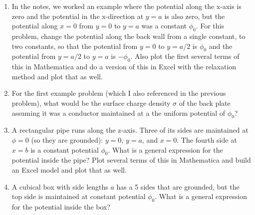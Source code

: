 \documentclass[letterpaper,12pt]{article}
\begin{document}
\begin{enumerate}
\setlength\itemsep{3 in}

\item
In the notes, we worked an example where the potential along the x-axis is zero and the potential in the x-direction at $y=a$ is also zero, but the potential along $x=0$ from $y=0$ to $y=a$ was a constant $\phi_0$. For this problem, change the potential along the back wall from a single constant, to two constants, so that the potential from $y=0$ to $y=a/2$ is $\phi_0$ and the potential from $y=a/2$ to $y=a$ is $-\phi_0$. Also plot the first several terms of this in Mathematica and do a version of this in Excel with the relaxation method and plot that as well.

\clearpage

\item
For the first example problem (which I also referenced in the previous problem), what would be the surface charge density $\sigma$ of the back plate assuming it was a conductor maintained at a the uniform potential of $\phi_0$?

\clearpage

\item
A rectangular pipe runs along the z-axis. Three of its sides are maintained at $\phi = 0$ (so they are grounded): $y=0$, $y=a$, and $x=0$. The fourth side at $x=b$ is a constant potential $\phi_0$. What is a general expression for the potential inside the pipe? Plot several terms of this in Mathematica and build an Excel model and plot that as well. 

\clearpage

\item
A cubical box with side lengths $a$ has a 5 sides that are grounded, but the top side is maintained at constant potential $\phi_0$. What is a general expression for the potential inside the box?
\clearpage


\end{enumerate}
\end{document}
